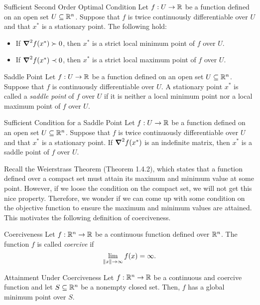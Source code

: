 \begin{thm}{Sufficient Second Order Optimal Condition}
	Let $f:U\to{\mathbb{R}}$ be a function defined on an open set $U\subseteq{\mathbb{R}}^n$. Suppose that $f$ is twice continuously differentiable over $U$ and that $x^*$ is a stationary point. The following hold: 
	\begin{itemize}
		\item If $\grad^2f(x^*)\succ0$, then $x^*$ is a strict local minimum point of $f$ over $U$.
		\item If $\grad^2f(x^*)\prec0$, then $x^*$ is a strict local maximum point of $f$ over $U$. 
	\end{itemize}
\end{thm}
\begin{df}{Saddle Point}
	Let $f:U\to{\mathbb{R}}$ be a function defined on an open set $U\subseteq{\mathbb{R}}^n$. Suppose that $f$ is continuously differentiable over $U$. A stationary point	$x^*$ is called a \textit{saddle point} of $f$ over $U$ if it is neither a local minimum point nor a local maximum point of $f$ over $U$.
\end{df}
\begin{thm}{Sufficient Condition for a Saddle Point}
	Let $f:U\to{\mathbb{R}}$ be a function defined on an open set $U\subseteq{\mathbb{R}}^n$. Suppose that $f$ is twice continuously differentiable over $U$ and that $x^*$ is a stationary point. If $\grad^2f(x^*)$ is an indefinite matrix, then $x^*$ is a saddle point of $f$ over $U$. 
\end{thm}
\begin{rmk}Recall the Weierstrass Theorem (Theorem 1.4.2), which states that a function defined over a compact set must attain its maximum and minimum value at some point. However, if we loose the condition on the compact set, we will not get this nice property. Therefore, we wonder if we can come up with some condition on the objective function to ensure the maximum and minimum values are attained. This motivates the following definition of coerciveness. 	
\end{rmk}
\begin{df}{Coerciveness}
	Let $f:{\mathbb{R}}^n\to{\mathbb{R}}$ be a continuous function defined over ${\mathbb{R}}^n$. The function $f$ is called \textit{coercive}	if \[\lim_{\norm{x}\to\infty}f(x)=\infty.\]
\end{df}
\begin{thm}{Attainment Under Coerciveness}
	Let $f:{\mathbb{R}}^n\to{\mathbb{R}}$ be a continuous and coercive function and let $S\subseteq{\mathbb{R}}^n$ be a nonempty closed set. Then, $f$ has a global minimum point over $S$. 
\end{thm}


